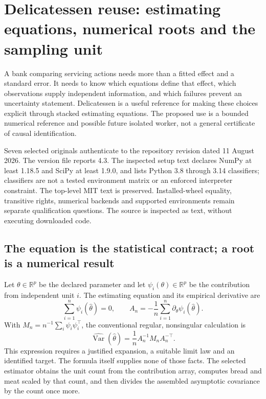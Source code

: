 \section{Delicatessen reuse: estimating equations, numerical roots and the sampling unit}
\label{sec:exec24-delicatessen-reuse}

A bank comparing servicing actions needs more than a fitted effect and a
standard error. It needs to know which equations define that effect, which
observations supply independent information, and which failures prevent an
uncertainty statement. Delicatessen is a useful reference for making these
choices explicit through stacked estimating equations. The proposed use is
a bounded numerical reference and possible future isolated worker, not a
general certificate of causal identification.~\citep{exec24_delicatessen_source,exec24_delicatessen_choice}

Seven selected originals authenticate to the repository revision dated
11 August 2026. The version file reports 4.3. The inspected setup text
declares NumPy at least 1.18.5 and SciPy at least 1.9.0, and lists Python
3.8 through 3.14 classifiers; classifiers are not a tested environment
matrix or an enforced interpreter constraint. The top-level MIT text is
preserved. Installed-wheel equality, transitive rights, numerical backends
and supported environments remain separate qualification questions.
The source is inspected as text, without executing downloaded code.
\citep{exec24_delicatessen_source}

\subsection{The equation is the statistical contract; a root is a numerical result}
Let $\theta\in\mathbb R^p$ be the declared parameter and let
$\psi_i(\theta)\in\mathbb R^p$ be the contribution from independent unit
$i$. The estimating equation and its empirical derivative are
\[
 \sum_{i=1}^n\psi_i(\widehat\theta)=0,\qquad
 A_n=-\frac1n\sum_{i=1}^n\partial_\theta\psi_i(\widehat\theta).
\]
With $M_n=n^{-1}\sum_i\psi_i\psi_i^\top$, the conventional regular,
nonsingular calculation is
\[
 \widehat{\operatorname{Var}}(\widehat\theta)
   =\frac1n A_n^{-1}M_nA_n^{-\top}.
\]
This expression requires a justified expansion, a suitable limit law and
an identified target. The formula itself supplies none of those facts.
The selected estimator obtains the unit count from the contribution
array, computes bread and meat scaled by that count, and then divides
the assembled asymptotic covariance by the count once more.
\citep{exec24_delicatessen_source}

